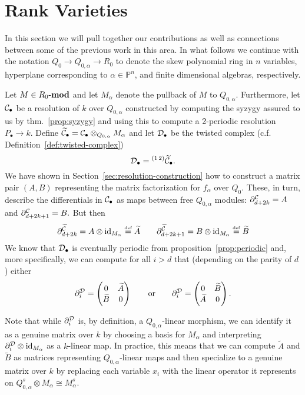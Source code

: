 \documentclass [11pt, proquest] {uwthesis}[2020/02/24]
\begin{document}
\section{Rank Varieties}
    In this section we will pull together our contributions as well as connections between some of the previous work in this area. In what follows we continue with the notation $Q_0\to Q_{0,\alpha}\to R_0$ to denote the skew polynomial ring in $n$ variables, hyperplane corresponding to $\alpha\in\mathbb P^n$, and finite dimensional algebras, respectively.
    
    
    Let $M\in R_0\text{-}\mathbf{mod}$ and let $M_\alpha$ denote the pullback of $M$ to $Q_{0,\alpha}.$ Furthermore, let $\mathcal{C}_\bullet$ be a resolution of $k$ over $Q_{0,\alpha}$ constructed by computing the syzygy assured to us by thm.~\ref{prop:syzygy} and using this to compute a 2-periodic resolution $P_\bullet\to k.$ Define $\widetilde{\mathcal{C}}_\bullet=\mathcal{C}_\bullet\otimes_{Q_{0,\alpha}} M_\alpha$ and let $\mathcal{D}_\bullet$ be the twisted complex (c.f. Definition~\ref{def:twisted-complex})
    \[\mathcal{D}_\bullet={^{(1\,2)}\widetilde{\mathcal{C}}_\bullet.}\]
    We have shown in Section~\ref{sec:resolution-construction} how to construct a matrix pair $(A,B)$ representing the matrix factorization for $f_\alpha$ over $Q_0$. These, in turn, describe the differentials in $\mathcal{C}_\bullet$ as maps between free $Q_{0,\alpha}$ modules: $\partial^{\mathcal{C}}_{d+2k}=A$ and $\partial^{\mathcal{C}}_{d+2k+1}=B.$ But then
    \[\partial^{\widetilde{\mathcal{C}}}_{d+2k}=A\otimes \operatorname{id}_{M_\alpha}\stackrel{\text{\tiny def}}{=}\widetilde{A}\qquad \partial^{\widetilde{\mathcal{C}}}_{d+2k+1}=B\otimes \operatorname{id}_{M_\alpha}\stackrel{\text{\tiny def}}{=}\widetilde{B}\]
    We know that $\mathcal{D}_\bullet$ is eventually periodic from proposition~\ref{prop:periodic} and, more specifically, we can compute for all $i>d$ that (depending on the parity of $d$) either
    \[\partial^{\mathcal{D}}_i=\begin{pmatrix}0&\widetilde{A}\\\widetilde{B}&0\end{pmatrix}\qquad\text{or}\qquad\partial^{\mathcal{D}}_i=\begin{pmatrix}0&\widetilde{B}\\\widetilde{A}&0\end{pmatrix}.\]
    
    Note that while $\partial^{\mathcal{D}}_i$ is, by definition, a $Q_{0,\alpha}$-linear morphism, we can identify it as a genuine matrix over $k$ by choosing a basis for $M_\alpha$ and interpreting $\partial_i^{\mathcal{D}}\otimes\operatorname{id}_{M_\alpha}$ as a $k$-linear map. In practice, this means that we can compute $\tilde A$ and $\tilde B$ as matrices representing $Q_{0,\alpha}$-linear maps and then specialize to a genuine matrix over $k$ by replacing each variable $x_i$ with the linear operator it represents on $Q_{0,\alpha}^s\otimes M_\alpha\cong M_\alpha^s.$
    
\end{document}
